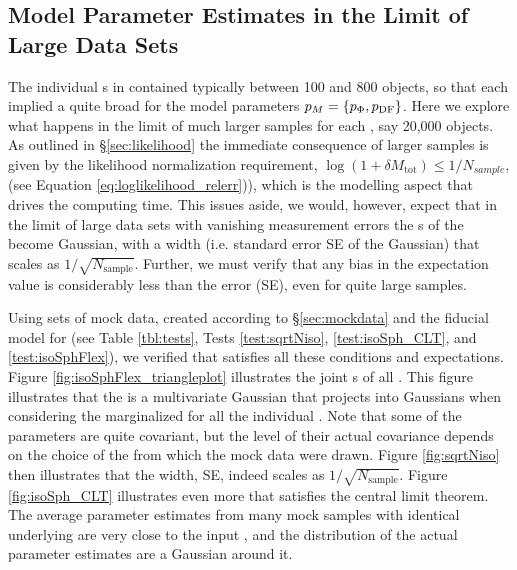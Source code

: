 \subsection{Model Parameter Estimates in the Limit of Large Data Sets} \label{sec:largedata}

The individual \MAP{}s in \citet{bov13} contained typically between 100 and 800 objects, so that each \MAP{} implied a quite broad \pdf{} for the model parameters $p_M{}=\{p_\Phi,p_\text{DF}\}$. Here we explore what happens in the limit of much larger samples for each \MAP{}, say 20,000 objects. As outlined in \S\ref{sec:likelihood} the immediate consequence of larger samples is given by the likelihood normalization requirement, $\log(1+\delta M_\text{tot})\le 1/N_{sample}$, (see Equation \ref{eq:loglikelihood_relerr})), which is the modelling aspect that drives the computing time. This issues aside, we would, however, expect that in the limit of large data sets with vanishing measurement errors the \pdf{}s of the \pmodel{} become Gaussian, with a \pdf{} width (i.e. standard error SE of the Gaussian) that scales as $1/\sqrt{N_\text{sample}}$. Further, we must verify that any bias in the \pdf{} expectation value is considerably less than the error (SE), even for quite large samples.

Using sets of mock data, created according to \S\ref{sec:mockdata} and the fiducial model for \pmodel{} (see Table \ref{tbl:tests}, Tests \ref{test:sqrtNiso}, \ref{test:isoSph_CLT}, and \ref{test:isoSphFlex}), we verified that \RM{} satisfies all these conditions and expectations. Figure \ref{fig:isoSphFlex_triangleplot} illustrates the joint \pdf{}s of all \pmodel{}. This figure illustrates that the \pdf{} is a multivariate Gaussian that projects into Gaussians when considering the marginalized \pdf{} for all the individual \pmodel{}. Note that some of the parameters are quite covariant, but the level of their actual covariance depends on the choice of the \pmodel{} from which the mock data were drawn. Figure \ref{fig:sqrtNiso} then illustrates that the \pdf{} width, SE, indeed scales as $1/\sqrt{N_\text{sample}}$. Figure \ref{fig:isoSph_CLT} illustrates even more that \RM{} satisfies the central limit theorem. The average parameter estimates from many mock samples with identical underlying \pmodel{} are very close to the input \pmodel{}, and the distribution of the actual parameter estimates are a Gaussian around it. 


